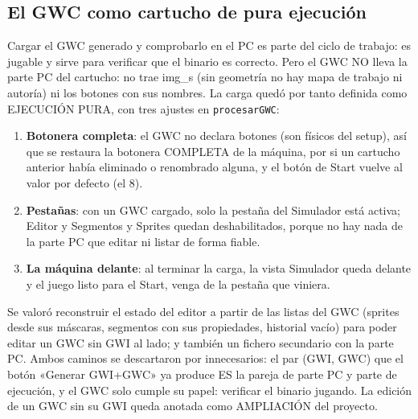 \subsection{El GWC como cartucho de pura ejecución}
\label{sec:F5I8GWC}

Cargar el GWC generado y comprobarlo en el PC es parte del ciclo de
trabajo: es jugable y sirve para verificar que el binario es
correcto. Pero el GWC NO lleva la parte PC del cartucho: no trae
img\_s (sin geometría no hay mapa de trabajo ni autoría) ni los
botones con sus nombres. La carga quedó por tanto definida como
EJECUCIÓN PURA, con tres ajustes en \texttt{procesarGWC}:

\begin{enumerate}
	\item \textbf{Botonera completa}: el GWC no declara botones (son
	físicos del setup), así que se restaura la botonera COMPLETA de la
	máquina, por si un cartucho anterior había eliminado o renombrado
	alguna, y el botón de Start vuelve al valor por defecto (el 8).

	\item \textbf{Pestañas}: con un GWC cargado, solo la pestaña del
	Simulador está activa; Editor y Segmentos y Sprites quedan
	deshabilitados, porque no hay nada de la parte PC que editar ni
	listar de forma fiable.

	\item \textbf{La máquina delante}: al terminar la carga, la vista
	Simulador queda delante y el juego listo para el Start, venga de
	la pestaña que viniera.
\end{enumerate}

Se valoró reconstruir el estado del editor a partir de las listas
del GWC (sprites desde sus máscaras, segmentos con sus propiedades,
historial vacío) para poder editar un GWC sin GWI al lado; y también
un fichero secundario con la parte PC. Ambos caminos se descartaron
por innecesarios: el par (GWI, GWC) que el botón «Generar GWI+GWC»
ya produce ES la pareja de parte PC y parte de ejecución, y el GWC
solo cumple su papel: verificar el binario jugando. La edición de un
GWC sin su GWI queda anotada como AMPLIACIÓN del proyecto.